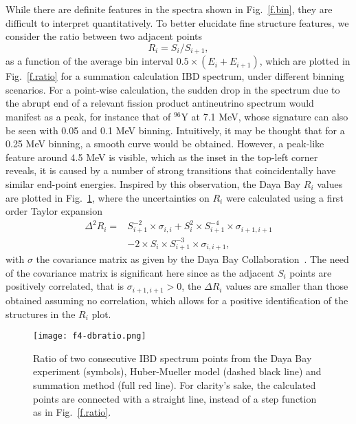 \documentclass[twocolumn,amsmath,amssymb,10pt,superscriptaddress,a4paper,letterpaper,fleqn]{revtex4-1}
\begin{document}
While there are definite features in the spectra shown in Fig.~\ref{f.bin},  they are difficult to interpret quantitatively.  
To better elucidate fine structure features, we consider the ratio between two adjacent points
\begin{equation}
  R_i =  S_i / S_{i+1},
\end{equation}
\noindent as a function of the average bin interval $0.5 \times ( E_i+E_{i+1} )$,
which are plotted  in Fig.~\ref{f.ratio} for a summation calculation IBD spectrum,
under different binning scenarios.   
For a point-wise calculation, the sudden drop in the spectrum due to the abrupt end of a relevant fission product antineutrino spectrum 
would manifest as a peak, for instance that of $^{96}$Y at 7.1 MeV, whose signature can also be seen with  0.05 and 0.1 MeV binning.
Intuitively, it may be thought that for a 0.25 MeV binning, a smooth curve would be obtained.   
However,  
a peak-like feature around 4.5 MeV is visible, which as the inset in the 
top-left corner reveals, it is caused by a number of strong transitions that coincidentally have similar end-point energies.
Inspired by this observation,  the Daya Bay $R_i$ values are plotted in Fig.~\ref{f.dbratio}, where the uncertainties on $R_i$ were calculated using a first order Taylor expansion
\begin{equation}
\begin{split}
  \Delta^2 R_i =  & S^{-2}_{i+1} \times \sigma_{i,i}   + S^2_i \times S^{-4}_{i+1} \times \sigma_{i+1,i+1} \\& - 2 \times S_i \times S^{-3}_{i+1} \times \sigma_{i,i+1}  ,
\end{split}
\end{equation}                   
\noindent with $\sigma$ the covariance matrix as given by the Daya Bay Collaboration~\cite{dayabay16}. 
The need of the covariance matrix is significant here since as the adjacent $S_i$ points are positively correlated,
that is  $\sigma_{i+1,i+1} > 0$, the $ \Delta R_i$ values are smaller than those obtained assuming no correlation, 
which allows for a positive identification of the structures in the $R_i$ plot.

\begin{figure}[t] 
\texttt{[image: f4-dbratio.png]}
\caption{
Ratio of two consecutive IBD spectrum points from the Daya Bay experiment (symbols), Huber-Mueller model (dashed black line) and
summation method (full red line). 
For clarity's sake, the calculated points are connected with a straight line, instead of a step function as in Fig.~\ref{f.ratio}. 
}
\label{f.dbratio}
\end{figure}   
\end{document}
